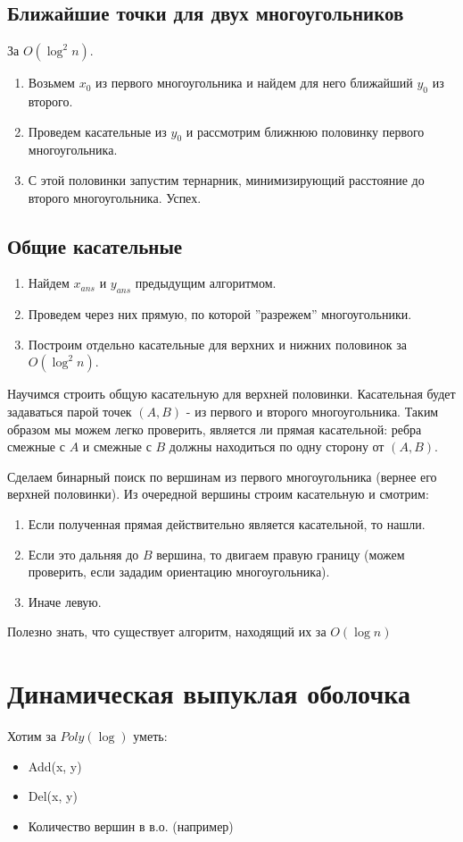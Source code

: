 \subsection{Ближайшие точки для двух многоугольников}
За $O(\log^2{n})$. 
\begin{enumerate}
    \item Возьмем $x_0$ из первого многоугольника и найдем для него ближайший $y_0$ из второго. 
    \item Проведем касательные из $y_0$ и рассмотрим ближнюю половинку первого многоугольника.
    \item С этой половинки запустим тернарник, минимизирующий расстояние до второго многоугольника. Успех.
\end{enumerate}


\subsection{Общие касательные}
\begin{enumerate}
    \item Найдем $x_{ans}$ и $y_{ans}$ предыдущим алгоритмом.
    \item Проведем через них прямую, по которой ''разрежем'' многоугольники. 
    \item Построим отдельно касательные для верхних и нижних половинок за $O(\log^2{n})$. 
\end{enumerate}
Научимся строить общую касательную для верхней половинки. Касательная будет задаваться парой точек $(A, B)$ - из первого и второго многоугольника. 
Таким образом мы можем легко проверить, является ли прямая касательной: ребра смежные с $A$ и смежные с $B$ должны находиться по одну сторону от $(A, B)$. 

Сделаем бинарный поиск по вершинам из первого многоугольника (вернее его верхней половинки). Из очередной вершины строим касательную и смотрим:
\begin{enumerate}
    \item Если полученная прямая действительно является касательной, то нашли.
    \item Если это дальняя до $B$ вершина, то двигаем правую границу (можем проверить, если зададим ориентацию многоугольника).
    \item Иначе левую. 
\end{enumerate}

Полезно знать, что существует алгоритм, находящий их за $O(\log{n})$


\section{Динамическая выпуклая оболочка}
Хотим за $Poly(\log)$ уметь:
\begin{itemize}
    \item Add(x, y)
    \item Del(x, y)
    \item Количество вершин в в.о. (например)
\end{itemize}

